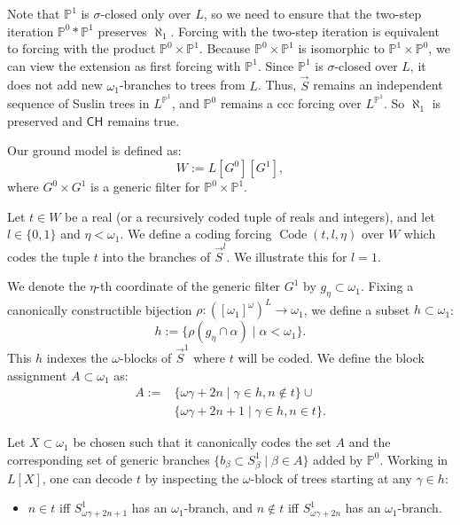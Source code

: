 \documentclass{article}
\theoremstyle{plain}
\theoremstyle{definition}
\newcommand{\code}{\operatorname{Code}}
\begin{document}
Note that $\mathbb{P}^1$ is $\sigma$-closed only over $L$, so we need to ensure that the two-step iteration $\mathbb{P}^0 \ast \mathbb{P}^1$ preserves $\aleph_1$. Forcing with the two-step iteration is equivalent to forcing with the product $\mathbb{P}^0 \times \mathbb{P}^1$. Because $\mathbb{P}^0 \times \mathbb{P}^1$ is isomorphic to $\mathbb{P}^1 \times \mathbb{P}^0$, we can view the extension as first forcing with $\mathbb{P}^1$. Since $\mathbb{P}^1$ is $\sigma$-closed over $L$, it does not add new $\omega_1$-branches to trees from $L$. Thus, $\vec{S}$ remains an independent sequence of Suslin trees in $L^{\mathbb{P}^1}$, and $\mathbb{P}^0$ remains a ccc forcing over $L^{\mathbb{P}^1}$. So $\aleph_1$ is preserved and $\mathsf{CH}$ remains true. 

Our ground model is defined as:
\[ W := L[G^0][G^1], \]
where $G^0 \times G^1$ is a generic filter for $\mathbb{P}^0 \times \mathbb{P}^1$.

Let $t \in W$ be a real (or a recursively coded tuple of reals and integers), and let $l \in \{0,1\}$ and $\eta < \omega_1$. We define a coding forcing $\code(t, l, \eta)$ over $W$ which codes the tuple $t$ into the branches of $\vec{S}^l$. We illustrate this for $l=1$.

We denote the $\eta$-th coordinate of the generic filter $G^1$ by $g_\eta \subset \omega_1$. Fixing a canonically constructible bijection $\rho: ([\omega_1]^\omega)^L \to \omega_1$, we define a subset $h \subset \omega_1$:
\[ h := \{\rho(g_\eta \cap \alpha) \mid \alpha < \omega_1\}. \]
This $h$ indexes the $\omega$-blocks of $\vec{S}^1$ where $t$ will be coded. We define the block assignment $A \subset \omega_1$ as:
\begin{align*}
A := &\{ \omega\gamma + 2n \mid \gamma \in h, n \notin t \} \cup \\
     &\{ \omega\gamma + 2n + 1 \mid \gamma \in h, n \in t \}.
\end{align*}

Let $X \subset \omega_1$ be chosen such that it canonically codes the set $A$ and the corresponding set of generic branches $\{b_\beta \subset S^1_\beta \mid \beta \in A\}$ added by $\mathbb{P}^0$. Working in $L[X]$, one can decode $t$ by inspecting the $\omega$-block of trees starting at any $\gamma \in h$:
\begin{itemize}
    \item[$(\ast)_1(\gamma, t)$:] $n \in t$ iff $S^1_{\omega\gamma + 2n + 1}$ has an $\omega_1$-branch, and $n \notin t$ iff $S^1_{\omega\gamma + 2n}$ has an $\omega_1$-branch.
\end{itemize}
\end{document}
